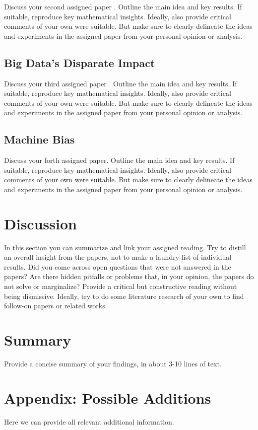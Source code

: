 \documentclass{article}
\begin{document}
Discuss your second assigned paper \cite{Berk.2018}. Outline the main idea and key results. If suitable, reproduce key mathematical insights. Ideally, also provide critical comments of your own were suitable. But make sure to clearly delineate the ideas and experiments in the assigned paper from your personal opinion or analysis.

\subsection{Big Data’s Disparate Impact}

Discuss your third assigned paper \cite{Barocas.2016}. Outline the main idea and key results. If suitable, reproduce key mathematical insights. Ideally, also provide critical comments of your own were suitable. But make sure to clearly delineate the ideas and experiments in the assigned paper from your personal opinion or analysis.

\subsection{Machine Bias}

Discuss your forth assigned paper. Outline the main idea and key results. If suitable, reproduce key mathematical insights. Ideally, also provide critical comments of your own were suitable. But make sure to clearly delineate the ideas and experiments in the assigned paper from your personal opinion or analysis.

\section{Discussion}

In this section you can summarize and link your assigned reading. Try to distill an overall insight from the papers, not to make a laundry list of individual results. Did you come across open questions that were not answered in the papers? Are there hidden pitfalls or problems that, in your opinion, the papers do not solve or marginalize? Provide a critical but constructive reading without being dismissive. Ideally, try to do some literature research of your own to find follow-on papers or related works. 

\section{Summary}

Provide a concise summary of your findings, in about 3-10 lines of text.

\section{Appendix: Possible Additions}
Here we can provide all relevant additional information.

\medskip
\small


\end{document}

